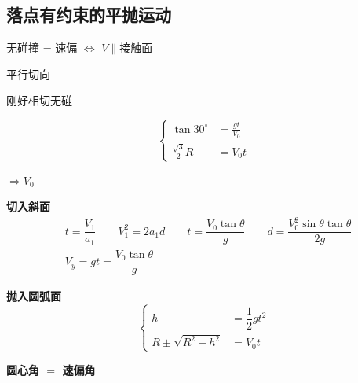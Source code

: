 \subsection{落点有约束的平抛运动}
\noindent 无碰撞 = 速偏 $\Leftrightarrow$ $V\parallel$接触面%

\noindent 平行\qquad 切向

\noindent 刚好相切无碰

\[
\left\{\begin{aligned}
\tan30^\circ&=\frac{gt}{V_0}\\
\frac{\sqrt3}{2}R&=V_0t
\end{aligned}\right.
\]%

\noindent {}%

\noindent $\Rightarrow V_0$

\textbf{切入斜面}
\begin{align*}
&t=\dfrac{V_1}{a_1}\qquad V_1^2=2a_1d\qquad t=\dfrac{V_0\tan\theta}{g}\qquad d=\dfrac{V_0^2\sin\theta\tan\theta}{2g}\\
&V_y=gt=\dfrac{V_0\tan\theta}{g}
\end{align*}

\textbf{抛入圆弧面}
\[
\left\{\begin{aligned}
h&=\dfrac12gt^2\\
R\pm\sqrt{R^2-h^2}&=V_0t
\end{aligned}\right.
\]

\textbf{圆心角 $=$ 速偏角}

